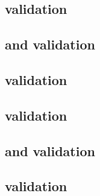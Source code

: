\begin{sbmlenum}

\end{sbmlenum} \subsection*{ validation} \begin{sbmlenum}


\end{sbmlenum} \subsection*{ and  validation} \begin{sbmlenum}


\end{sbmlenum} \subsection*{ validation} \begin{sbmlenum}


\end{sbmlenum} \subsection*{ validation} \begin{sbmlenum}


\end{sbmlenum} \subsection*{ and  validation} \begin{sbmlenum}


\end{sbmlenum} \subsection*{ validation} \begin{sbmlenum}


\end{sbmlenum}
